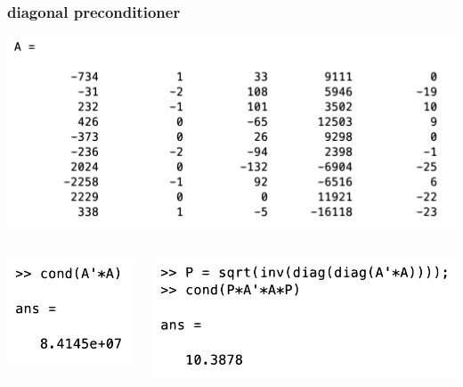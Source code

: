 \documentclass[compress]{beamer}
\begin{document}
\begin{frame}
	\frametitle{diagonal preconditioner}
	\begin{center}
		\includegraphics[width=.7\textwidth]{poorly_cond_a.png}
	\end{center}
\vspace{2em}

  \begin{columns}[t]
	\begin{column}{0.3\textwidth}
		\vspace{-6.4em}
		
		\includegraphics[width=.8\textwidth]{cond1.png}
	\end{column}
	\begin{column}{0.7\textwidth}
		\includegraphics[width=.8\textwidth]{cond2.png}
	\end{column}
\end{columns}
\end{frame}
\end{document}
